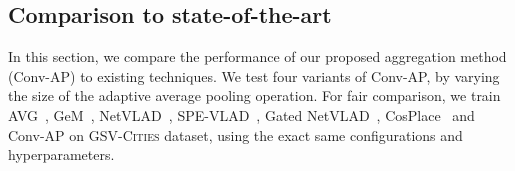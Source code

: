 \documentclass{article}
\begin{document}
\subsection{Comparison to state-of-the-art}
\label{sec:exp:sota}
In this section, we compare the performance of our proposed aggregation method (Conv-AP) to existing techniques. We test four variants of Conv-AP, by varying the size  of the adaptive average pooling operation. For fair comparison, we train AVG~\cite{arandjelovic2016netvlad}, GeM~\cite{radenovic2018fine}, NetVLAD~\cite{arandjelovic2016netvlad}, SPE-VLAD~\cite{yu2019spatial}, Gated NetVLAD~\cite{zhang2021vector}, CosPlace~\cite{berton2022rethinking} and Conv-AP on \textsc{GSV-Cities} dataset, using the exact same configurations and hyperparameters.


\setlength{\tabcolsep}{10pt}
\begin{table*}[t]
\caption{Comparison with state-of-the-art approaches on  place recognition benchmarks. Note that all models are trained on \textsc{GSV-Cities} and directly evaluated on Pitts250k, MSLS, SPED and Nordland datasets. Conv-AP is our method, with  representing the height and width of the adaptive average pooling operation.}
\label{tab:sota-results}
\end{table*}
\end{document}
